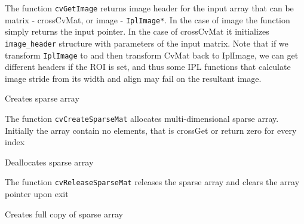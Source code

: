 The function \texttt{cvGetImage} returns image header for the input array
that can be matrix - cross{CvMat}, or image - \texttt{IplImage*}. In
the case of image the function simply returns the input pointer. In the
case of cross{CvMat} it initializes \texttt{image\_header} structure
with parameters of the input matrix. Note that if we transform
\texttt{IplImage} to  and then transform CvMat back to
IplImage, we can get different headers if the ROI is set, and thus some
IPL functions that calculate image stride from its width and align may
fail on the resultant image.


Creates sparse array


\begin{description}
\end{description}

The function \texttt{cvCreateSparseMat} allocates multi-dimensional sparse array. Initially the array contain no elements, that is cross{Get} or  return zero for every index


Deallocates sparse array


\begin{description}
\end{description}


The function \texttt{cvReleaseSparseMat} releases the sparse array and clears the array pointer upon exit



Creates full copy of sparse array


